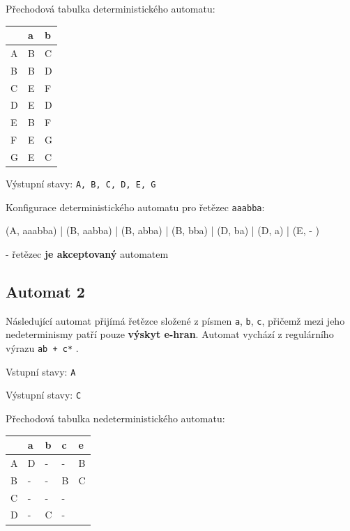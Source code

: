 \documentclass[11pt]{article}
\begin{document}
\bigskip

Přechodová tabulka deterministického automatu:

\bigskip

\begin{tabular}{| l | l | l |}
\hline
  & a & b \\ \hline
A & B & C \\ \hline
B & B & D \\ \hline
C & E & F \\ \hline
D & E & D \\ \hline
E & B & F \\ \hline
F & E & G \\ \hline
G & E & C \\
\hline
\end{tabular}

\bigskip

Výstupní stavy: \texttt{A, B, C, D, E, G}

\bigskip

Konfigurace deterministického automatu pro řetězec \texttt{aaabba}:

(A, aaabba) | (B, aabba) | (B, abba) | (B, bba) | (D, ba) | (D, a) | (E, - )

- řetězec  \textbf{je akceptovaný} automatem

\newpage

\subsection{Automat 2}
Následující automat přijímá řetězce složené z písmen \texttt{a}, \texttt{b}, \texttt{c}, přičemž mezi jeho nedeterminismy patří pouze \textbf{výskyt e-hran}. Automat vychází z regulárního výrazu \texttt{ab + c*} . 

\bigskip

Vstupní stavy: \texttt{A}

Výstupní stavy: \texttt{C}

\bigskip

Přechodová tabulka nedeterministického automatu:

\bigskip

\begin{tabular}{| l | l | l | l || l |}
\hline
  & a & b & c & e \\ \hline
A & D & - & - & B \\ \hline
B & - & - & B & C \\ \hline
C & - & - & - &  \\ \hline
D & - & C & - &  \\
\hline
\end{tabular}
\end{document}
